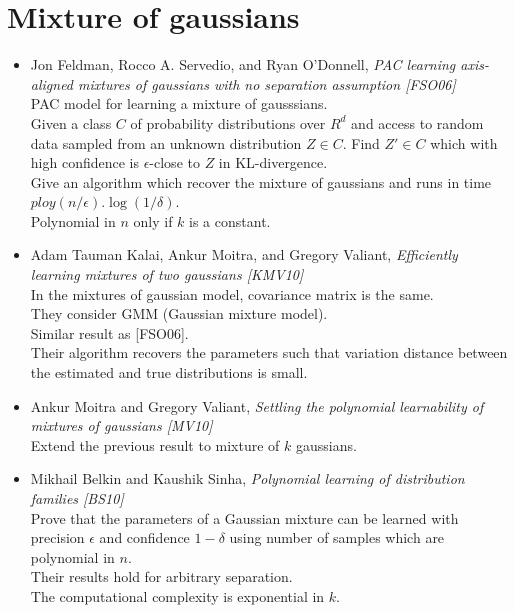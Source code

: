 \documentclass[12pt]{article}
\begin{document}
\section{Mixture of gaussians}
	\begin{itemize}
		\item Jon Feldman, Rocco A. Servedio, and Ryan O’Donnell, {\em PAC learning axis-aligned mixtures of gaussians with no separation assumption [FSO06]}\\
		PAC model for learning a mixture of gausssians.\\
		Given a class $C$ of probability distributions over $R^d$ and access to random data sampled from an unknown distribution $Z \in C$. Find $Z' \in C$ which with high confidence is $\epsilon$-close to $Z$ in KL-divergence.\\
		Give an algorithm which recover the mixture of gaussians and runs in time $ploy(n/\epsilon).\log(1/\delta)$.\\
		Polynomial in $n$ only if $k$ is a constant. 
		
		\item Adam Tauman Kalai, Ankur Moitra, and Gregory Valiant, {\em Efficiently learning mixtures of two gaussians [KMV10]}\\
		In the mixtures of gaussian model, covariance matrix is the same.\\
		They consider GMM (Gaussian mixture model).\\
		Similar result as [FSO06].\\
		Their algorithm recovers the parameters such that variation distance between the estimated and true distributions is small.
		
		\item Ankur Moitra and Gregory Valiant, {\em Settling the polynomial learnability of mixtures of gaussians [MV10]}\\
		Extend the previous result to mixture of $k$ gaussians.
		
		\item Mikhail Belkin and Kaushik Sinha, {\em Polynomial learning of distribution families [BS10]}\\
		Prove that the parameters of a Gaussian mixture can be learned with precision $\epsilon$ and confidence $1−\delta$ using number of samples which are polynomial in $n$.\\
		Their results hold for arbitrary separation.\\
		The computational complexity is exponential in $k$.
		

\end{itemize}
\end{document}
